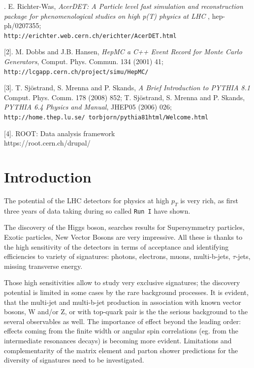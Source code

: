 \begin{titlepage}
[1]. E. Richter-Was, {\it AcerDET: A Particle level fast simulation and reconstruction 
package for phenomenological studies on high p(T) physics at LHC },
hep-ph/0207355;\\ {\tt http://erichter.web.cern.ch/erichter/AcerDET.html}

[2]. M. Dobbs and J.B. Hansen, {\it  HepMC a C++ Event Record for Monte Carlo Generators},
Comput. Phys. Commun. 134 (2001) 41;\\ {\tt http://lcgapp.cern.ch/project/simu/HepMC/}

[3]. T. Sjöstrand, S. Mrenna and P. Skands, {\it A Brief Introduction to PYTHIA 8.1} Comput. Phys. Comm. 178 (2008) 852;
T. Sjöstrand, S. Mrenna and P. Skands, {\it PYTHIA 6.4 Physics and Manual}, JHEP05 (2006) 026;\\
{\tt http://home.thep.lu.se/~torbjorn/pythia81html/Welcome.html}

[4]. ROOT: Data analysis framework \\ https://root.cern.ch/drupal/


\end{titlepage}

 


\boldmath
\section{Introduction}
\unboldmath

The potential of the LHC detectors for physics at high  $p_T$ is
very rich, as first three years of data taking during so called {\tt Run I}
have shown.
 
The discovery of the Higgs boson, searches results for Supersymmetry particles,
Exotic particles, New Vector Bosons are very impressive. 
All these is thanks to the high sensitivity of the detectors
in terms of acceptance and identifying efficiencies to variety of 
signatures: photons, electrons, muons, multi-b-jets, $\tau$-jets, missing
transverse energy.

Those high sensitivities allow to study very
exclusive signatures;  the discovery potential is 
limited in some cases by the rare background processes.
It is  evident, that the multi-jet and multi-b-jet
production in association with known vector bosons, W and/or Z, or with
top-quark pair is the the serious background to the several
observables as well. 
The importance of effect beyond the leading order:
effects coming from the finite width or angular spin correlations (eg. from the 
intermediate resonances decays) is becoming more evident.
Limitations and complementarity of the matrix
element and parton shower predictions for the diversity of signatures
need to be investigated.

